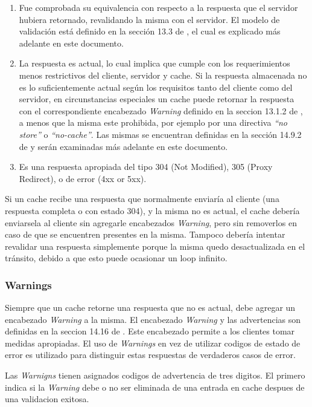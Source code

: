 \begin{enumerate}
  \item Fue comprobada su equivalencia con respecto a la respuesta que el servidor hubiera retornado, revalidando la misma con el servidor. El modelo de validación está definido
  en la sección 13.3 de \cite{rfc2616}, el cual es explicado más adelante en este documento.
  \item La respuesta es actual, lo cual implica que cumple con los requerimientos menos restrictivos del cliente, servidor y cache.
  Si la respuesta almacenada no es lo suficientemente actual según los requisitos tanto del cliente como del servidor, en circunstancias especiales un cache puede retornar
  la respuesta con el correspondiente encabezado \emph{Warning} definido en la seccion 13.1.2 de \cite{rfc2616}, a menos que la misma este prohibida, por ejemplo por una
  directiva \emph{``no store''} o \emph{``no-cache''}. Las mismas se encuentran definidas en la sección 14.9.2 de \cite{rfc2616} y serán examinadas más adelante en este
  documento.
  \item Es una respuesta apropiada del tipo 304 (Not Modified), 305 (Proxy Redirect), o de error (4xx or 5xx).
\end{enumerate}

Si un cache recibe una respuesta que normalmente enviaría al cliente (una respuesta completa o con estado 304), y la misma no es actual, el cache debería enviarsela
al cliente sin agregarle encabezados \emph{Warning}, pero sin removerlos en caso de que se encuentren presentes en la misma. Tampoco debería intentar revalidar una respuesta
simplemente porque la misma quedo desactualizada en el tránsito, debido a que esto puede ocasionar un loop infinito.

\subsubsection{Warnings}

Siempre que un cache retorne una respuesta que no es actual, debe agregar un encabezado \emph{Warning} a la misma. El encabezado \emph{Warning} y las advertencias son definidas
en la seccion 14.16 de \cite{rfc2612}. Este encabezado permite a los clientes tomar medidas apropiadas. El uso de \emph{Warnings} en vez de utilizar codigos de estado
de error es utilizado para distinguir estas respuestas de verdaderos casos de error.

Las \emph{Warnigns} tienen asignados codigos de advertencia de tres digitos. El primero indica si la \emph{Warning} debe o no ser eliminada de una entrada en cache despues de
una validacion exitosa.

